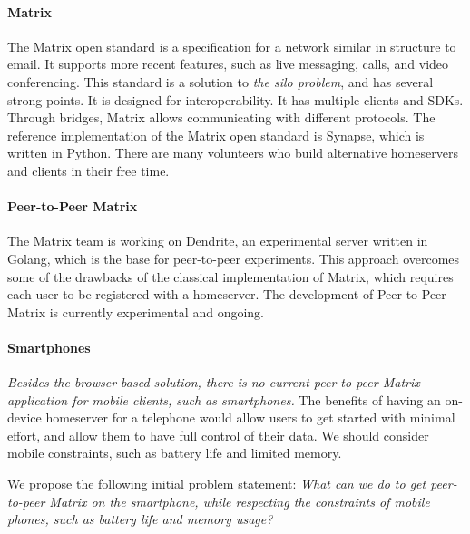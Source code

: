 \paragraph{Matrix}
The Matrix open standard\cite{matrix_org_spec} is a specification for a network similar in structure to email.
It supports more recent features, such as live messaging, calls, and video conferencing.
This standard is a solution to \textit{the silo problem}, and has several strong points.
It is designed for interoperability.
It has multiple clients\cite{matrix_org_clients} and SDKs\cite{matrix_org_sdks}.
Through bridges, Matrix allows communicating with different protocols\cite{matrix_org_bridges}.
The reference implementation of the Matrix open standard is Synapse\cite{matrix_org_synapse}, which is written in Python.
There are many volunteers who build alternative homeservers and clients in their free time.

\paragraph{Peer-to-Peer Matrix}
The Matrix team is working on Dendrite\cite{matrix_org_dendrite}, an experimental server written in Golang, which is the base for peer-to-peer experiments.
This approach overcomes some of the drawbacks of the classical implementation of Matrix, which requires each user to be registered with a homeserver.
The development of Peer-to-Peer Matrix is currently experimental and ongoing.

\paragraph{Smartphones}
\textit{Besides the browser-based solution, there is no current peer-to-peer Matrix application for mobile clients, such as smartphones.}
The benefits of having an on-device homeserver for a telephone would allow users to get started with minimal effort, and allow them to have full control of their  data.
We should consider mobile constraints, such as battery life and limited memory.

\begin{center}
    We propose the following initial problem statement: \textit{What can we do to get peer-to-peer Matrix on the smartphone, while respecting the constraints of mobile phones, such as battery life and memory usage?}
\end{center}
